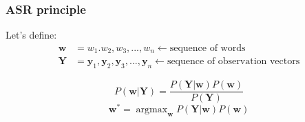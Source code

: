 \documentclass{beamer}
\DeclareMathOperator*{\argmax}{argmax}
\newcommand{\m}[1]{\bm{#1}}
\renewcommand{\vec}[1]{\bm{#1}}
\begin{document}
\begin{frame}
  \frametitle{ASR principle}
  
    Let's define: 
    \vspace{-1em}
      	\begin{align*}
	      \vec{w} &= w_1. w_2, w_3, ..., w_n \leftarrow \text{sequence of words} \\
	      \m{Y} &= \vec{y}_1, \vec{y}_2, \vec{y}_3, ..., \vec{y}_n  \leftarrow \text{sequence of     observation vectors}
	    \end{align*}  
  
  
  \begin{minipage}[tb]{0.57\textwidth}
  \end{minipage}%
  \hfill
  \begin{minipage}[b]{0.39\textwidth} 
	  \begin{equation*}
	    P(\vec{w} | \m{Y}) = \frac{P(\m{Y} | \vec{w}) P(\vec{w})}{P(\m{Y})}
	  \end{equation*}
	  \begin{equation*}
      \vec{w^*} = \argmax_{\vec{w}} P(\m{Y} | \vec{w}) P(\vec{w})
    \end{equation*}	
    
  \end{minipage}

\end{frame}
\end{document}
